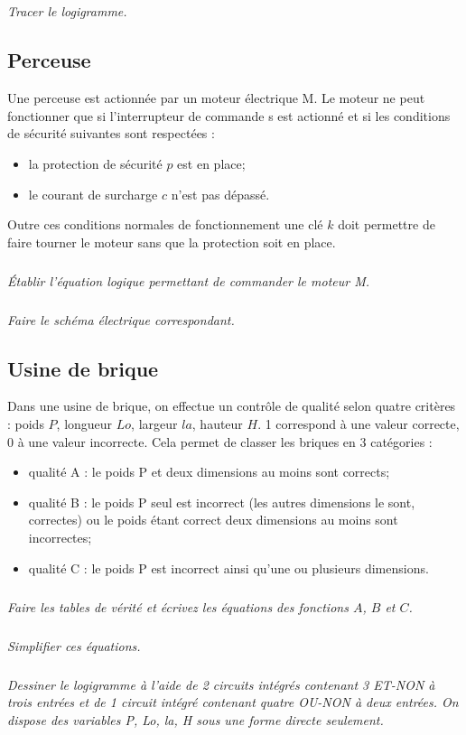 \documentclass[10pt]{article}
\begin{document}
\subparagraph{}
\textit{Tracer le logigramme.}


\subsection*{Perceuse}
\setcounter{subparagraph}{0}
Une perceuse est actionnée par un moteur électrique M. Le moteur ne peut fonctionner que si l’interrupteur de commande s est actionné et si les conditions de sécurité suivantes sont respectées :
\begin{itemize}
\item la protection de sécurité $p$ est en place;
\item le courant de surcharge $c$ n’est pas dépassé.
\end{itemize}

Outre ces conditions normales de fonctionnement une clé $k$ doit permettre de faire tourner le moteur sans que la protection soit en place.

\subparagraph{}
\textit{Établir l’équation logique permettant de commander le moteur M.}

\subparagraph{}
\textit{Faire le schéma électrique correspondant.}

\subsection*{Usine de brique}
\setcounter{subparagraph}{0}
Dans une usine de brique, on effectue un contrôle de qualité selon quatre 
critères : poids $P$, longueur $Lo$, largeur $la$, hauteur $H$. 1 correspond à une valeur correcte, 0 à une valeur incorrecte. Cela permet de classer les briques en 3 catégories :
\begin{itemize}
\item qualité A : le poids P et deux dimensions au moins sont corrects;
\item qualité B : le poids P seul est incorrect (les autres dimensions le sont, correctes) ou le poids étant correct deux dimensions au moins sont incorrectes;
\item qualité C : le poids P est incorrect ainsi qu’une ou plusieurs dimensions.
\end{itemize}

\subparagraph{}
\textit{Faire les tables de vérité et écrivez les équations des fonctions $A$, $B$ et $C$.}

\subparagraph{}
\textit{Simplifier ces équations.}


\subparagraph{}
\textit{Dessiner le logigramme à l’aide de 2 circuits intégrés contenant 3 ET-NON à trois entrées et de 1 circuit intégré contenant quatre OU-NON à deux entrées. On dispose des variables P, Lo, la, H sous une forme directe seulement.}
\end{document}
